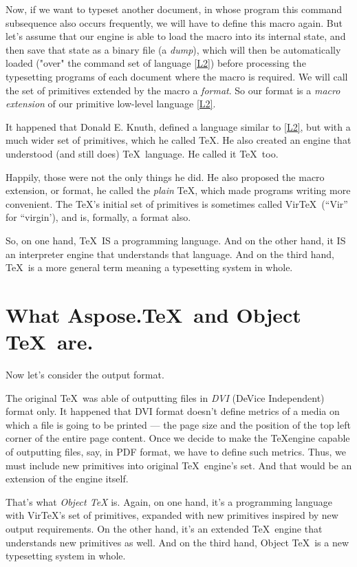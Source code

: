 Now, if we want to typeset another document, in whose program this command subsequence also occurs frequently, we will have to define this macro again. But let's assume that our engine is able to load the macro  into its internal state, and then save that state as a binary file (a {\it dump}), which will then be automatically loaded ("over" the command set of language \ref{L2}) before processing the typesetting programs of each document where the macro  is required. We will call the set of primitives extended by the  macro a {\it format}. So our format is a {\it macro extension} of our primitive low-level language \ref{L2}.

It happened that Donald E. Knuth, defined a language similar to \ref{L2}, but with a much wider set of primitives, which he called \TeX. He also created an engine that understood (and still does) \TeX\ language. He called it \TeX\ too.

Happily, those were not the only things he did. He also proposed the macro extension, or format, he called the {\it plain} \TeX, which made programs writing more convenient. The \TeX's initial set of primitives is sometimes called Vir\TeX\ (``Vir'' for ``virgin'), and is, formally, a format also.

So, on one hand, \TeX\ IS a programming language. And on the other hand, it IS an interpreter engine that understands that language. And on the third hand, \TeX\ is a more general term meaning a typesetting system in whole.

\section{What Aspose.\TeX\ and Object \TeX\ are.}

Now let's consider the output format.

The original \TeX\ was able of outputting files in {\it DVI} (DeVice Independent) format only. It happened that DVI format doesn't define metrics of a media on which a file is going to be printed --- the page size and the position of the top left corner of the entire page content. Once we decide to make the \TeX engine capable of outputting files, say, in PDF format, we have to define such metrics. Thus, we must include new primitives into original \TeX\ engine's set. And that would be an extension of the engine itself.

That's what {\it Object \TeX} is. Again, on one hand, it's a programming language with Vir\TeX's set of primitives, expanded with new primitives inspired by new output requirements. On the other hand, it's an extended \TeX\ engine that understands new primitives as well. And on the third hand, Object \TeX\ is a new typesetting system in whole.

